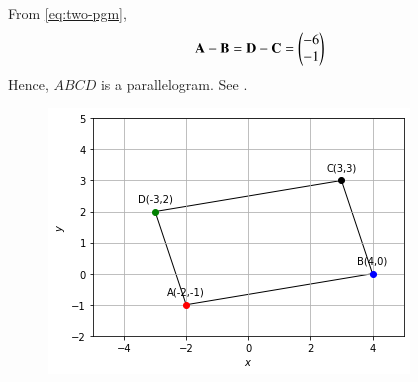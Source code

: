 	  From \eqref{eq:two-pgm},
\begin{align}
\mathbf{A}-\mathbf{B} = 
\mathbf{D}-\mathbf{C} =  \begin{pmatrix}-6\\-1\end{pmatrix}
\end{align}
Hence, $ABCD$ is a parallelogram.
See .
\begin{figure}[h!]
  \centering
   \includegraphics[width=\columnwidth]{chapters/11/10/1/9/figs/paralellogram.png}
    \caption{}
     \label{fig:chapters/11/10/1/91}  
\end{figure}



